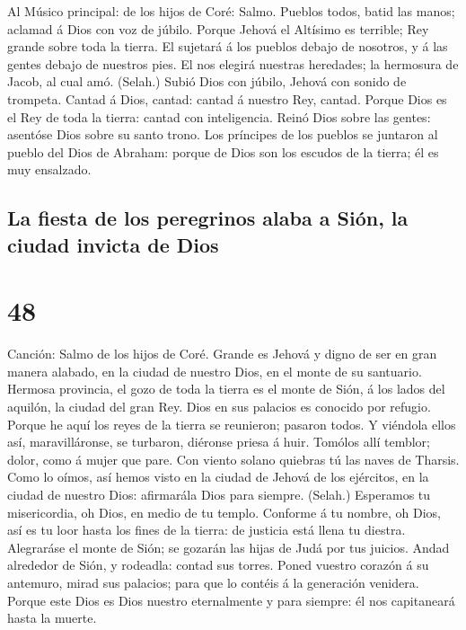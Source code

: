 Al Músico principal: de los hijos de Coré: Salmo. Pueblos
todos, batid las manos; aclamad á Dios con voz de júbilo. 
Porque Jehová el Altísimo es terrible; Rey grande sobre toda la tierra.
 El sujetará á los pueblos debajo de nosotros, y á las
gentes debajo de nuestros pies.  El nos elegirá nuestras
heredades; la hermosura de Jacob, al cual amó. (Selah.) 
Subió Dios con júbilo, Jehová con sonido de trompeta. 
Cantad á Dios, cantad: cantad á nuestro Rey, cantad. 
Porque Dios es el Rey de toda la tierra: cantad con inteligencia.
 Reinó Dios sobre las gentes: asentóse Dios sobre su santo
trono.  Los príncipes de los pueblos se juntaron al pueblo
del Dios de Abraham: porque de Dios son los escudos de la tierra; él es
muy ensalzado.

\hypertarget{la-fiesta-de-los-peregrinos-alaba-a-siuxf3n-la-ciudad-invicta-de-dios}{%
\subsection{La fiesta de los peregrinos alaba a Sión, la ciudad invicta
de
Dios}\label{la-fiesta-de-los-peregrinos-alaba-a-siuxf3n-la-ciudad-invicta-de-dios}}

\hypertarget{section-47}{%
\section{48}\label{section-47}}

 Canción: Salmo de los hijos de Coré. Grande es Jehová y
digno de ser en gran manera alabado, en la ciudad de nuestro Dios, en el
monte de su santuario.  Hermosa provincia, el gozo de toda
la tierra es el monte de Sión, á los lados del aquilón, la ciudad del
gran Rey.  Dios en sus palacios es conocido por refugio.
 Porque he aquí los reyes de la tierra se reunieron;
pasaron todos.  Y viéndola ellos así, maravilláronse, se
turbaron, diéronse priesa á huir.  Tomólos allí temblor;
dolor, como á mujer que pare.  Con viento solano quiebras
tú las naves de Tharsis.  Como lo oímos, así hemos visto
en la ciudad de Jehová de los ejércitos, en la ciudad de nuestro Dios:
afirmarála Dios para siempre. (Selah.)  Esperamos tu
misericordia, oh Dios, en medio de tu templo.  Conforme á
tu nombre, oh Dios, así es tu loor hasta los fines de la tierra: de
justicia está llena tu diestra.  Alegraráse el monte de
Sión; se gozarán las hijas de Judá por tus juicios. 
Andad alrededor de Sión, y rodeadla: contad sus torres. 
Poned vuestro corazón á su antemuro, mirad sus palacios; para que lo
contéis á la generación venidera.  Porque este Dios es
Dios nuestro eternalmente y para siempre: él nos capitaneará hasta la
muerte.

